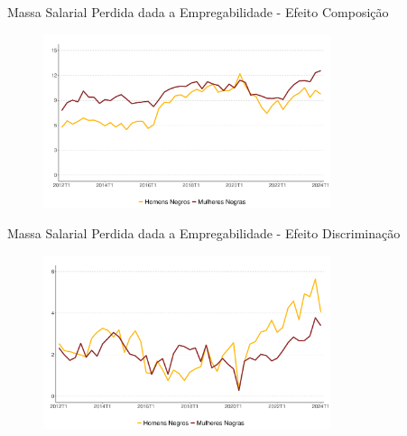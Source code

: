 \documentclass[10pt, xcolor=x11names,compress]{beamer}
\begin{document}
	\begin{frame}{Massa Salarial Perdida dada a Empregabilidade - Efeito Composição}
	\begin{figure}
		\centering
		\includegraphics[width = 0.75\textwidth]{figures_output/perda_massa_emp_composicao.pdf}
	\end{figure}
\end{frame}	

	\begin{frame}{Massa Salarial Perdida dada a Empregabilidade - Efeito Discriminação}
	\begin{figure}
		\centering
		\includegraphics[width = 0.75\textwidth]{figures_output/perda_massa_emp_discriminacao.pdf}
	\end{figure}
\end{frame}	
\end{document}
